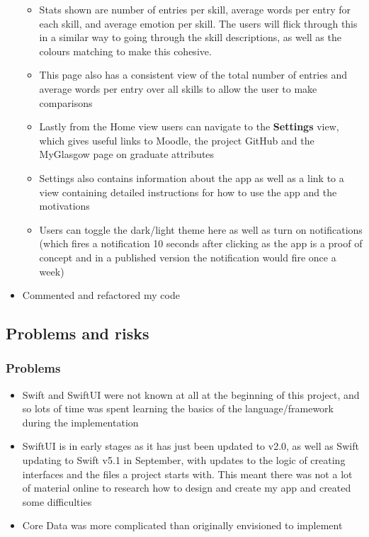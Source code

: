\documentclass[11pt]{article}
\begin{document}
\begin{itemize}
\begin{itemize}
        \item Stats shown are number of entries per skill, average words per entry for each skill, and average emotion per skill. The users will flick through this in a similar way to going through the skill descriptions, as well as the colours matching to make this cohesive.
        \item This page also has a consistent view of the total number of entries and average words per entry over all skills to allow the user to make comparisons
        \item Lastly from the Home view users can navigate to the \textbf{Settings} view, which gives useful links to Moodle, the project GitHub and the MyGlasgow page on graduate attributes
        \item Settings also contains information about the app as well as a link to a view containing detailed instructions for how to use the app and the motivations
        \item Users can toggle the dark/light theme here as well as turn on notifications (which fires a notification 10 seconds after clicking as the app is a proof of concept and in a published version the notification would fire once a week)
    \end{itemize}
    \item Commented and refactored my code
\end{itemize}

\subsection{Problems and risks}\label{problems-and-risks}

\subsubsection{Problems}\label{problems}

\begin{itemize}
    \item Swift and SwiftUI were not known at all at the beginning of this project, and so lots of time was spent learning the basics of the language/framework during the implementation
    \item SwiftUI is in early stages as it has just been updated to v2.0, as well as Swift updating to Swift v5.1 in September, with updates to the logic of creating interfaces and the files a project starts with. This meant there was not a lot of material online to research how to design and create my app and created some difficulties
    \item Core Data was more complicated than originally envisioned to implement
\end{itemize}
\end{document}
